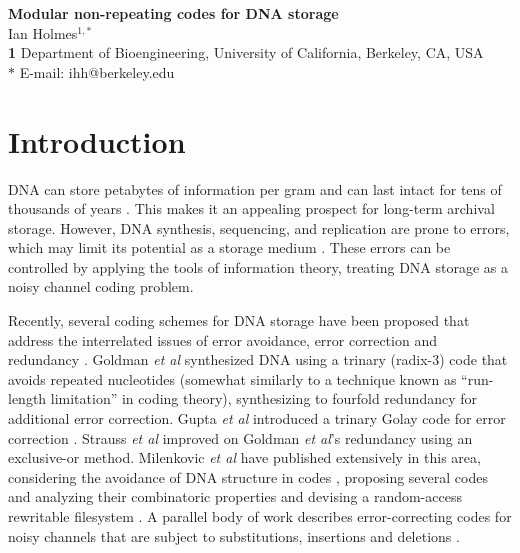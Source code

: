 \documentclass[english]{article}
\begin{document}
\newcommand\authorstring{
Ian Holmes$^{1,\ast}$ \\
\textbf{1} Department of Bioengineering, University of California, Berkeley, CA, USA \\
$\ast$ E-mail: ihh@berkeley.edu
}

\newcommand\titlestring{Modular non-repeating codes for DNA storage}
\newcommand\shorttitlestring{Modular codes for DNA}
\markboth{\shorttitlestring}{\shorttitlestring}
\begin{flushleft}
{\Large \textbf{\titlestring} } \\
\authorstring
\end{flushleft}

\section{Introduction}

DNA can store petabytes of information per gram \cite{GoldmanEtAl2013} and can last intact for tens of thousands of years \cite{GreenEtAl2010}.
This makes it an appealing prospect for long-term archival storage.
However, DNA synthesis, sequencing, and replication are prone to errors, which may limit its potential as a storage medium \cite{ChurchEtAl2012}.
These errors can be controlled by applying the tools of information theory,
treating DNA storage as a noisy channel coding problem.

Recently, several coding schemes for DNA storage have been proposed
that address the interrelated issues of error avoidance, error correction and redundancy
\cite{GoldmanEtAl2013,MilenkovicEtAl2005,YazdiEtAl2015,GuptaEtAl2015,MilenkovicEtAl2014,MilenkovicEtAl2015,GabrysEtAl2015,MilenkovicEtAl2016,BornholtEtAl2016}.
Goldman {\em et al} \cite{GoldmanEtAl2013} synthesized DNA using a trinary (radix-3) code that avoids repeated nucleotides
(somewhat similarly to a technique known as ``run-length limitation'' in coding theory),
synthesizing to fourfold redundancy for additional error correction.
Gupta {\em et al} introduced a trinary Golay code for error correction \cite{GuptaEtAl2015}.
Strauss {\em et al} improved on Goldman {\em et al}'s redundancy using an exclusive-or method.
Milenkovic {\em et al} have published extensively in this area,
considering the avoidance of DNA structure in codes \cite{MilenkovicEtAl2005},
proposing several codes and analyzing their combinatoric properties \cite{MilenkovicEtAl2014,MilenkovicEtAl2015,GabrysEtAl2015,MilenkovicEtAl2016}
and devising a random-access rewritable filesystem \cite{YazdiEtAl2015}.
A parallel body of work describes error-correcting codes for noisy channels that are subject to
substitutions, insertions and deletions \cite{DaveyMackay2000,DaveyMackay2001}.
\end{document}
